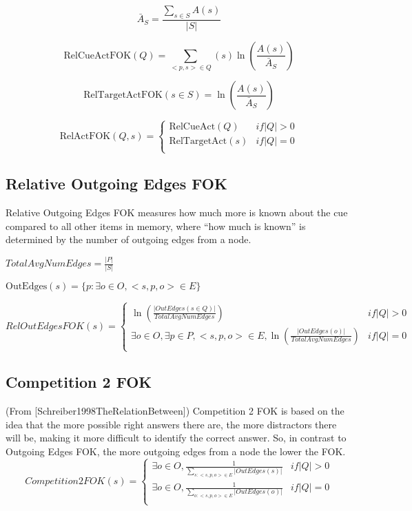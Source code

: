 \documentclass[10pt,letterpaper]{article}
\begin{document}
$$\bar{A}_S = \frac {\sum_{s{\in}S} {A(s)}}{|S|}$$

$$\text{RelCueActFOK}(Q) = \sum_{<p, s> \in Q} (s) \ln(\frac{A(s)}{\bar{A}_S})$$

$$\text{RelTargetActFOK}(s{\in}S) = \ln(\frac{A(s)}{\bar{A}_S})$$

$$\text{RelActFOK}(Q, s) =
\begin{cases}
    \text{RelCueAct}(Q) & {if |Q| > 0} \\
    \text{RelTargetAct}(s)& {if |Q| = 0} \\
\end{cases}
$$

\subsection{Relative Outgoing Edges FOK}

Relative Outgoing Edges FOK measures how much more is known about the cue compared to all other items in memory, where “how much is known” is determined by the number of outgoing edges from a node.

$TotalAvgNumEdges = \frac{|P|}{|S|}$

$\text{OutEdges}(s) = \{p : \exists o{\in}O, <s, p, o>{\in}E \}$

$$RelOutEdgesFOK(s) =
\begin{cases}
    \ln (\frac{|OutEdges(s \in Q)|}{TotalAvgNumEdges}) & {if |Q| > 0} \\
    \exists o{\in}O, \exists p{\in}P, <s, p, o>{\in}E, \ln(\frac{|OutEdges(o)|}{TotalAvgNumEdges}) & {if |Q| = 0} \\
\end{cases}
$$

\subsection{Competition 2 FOK}

(From [Schreiber1998TheRelationBetween])
Competition 2 FOK is based on the idea that the more possible right answers there are, the more distractors there will be, making it more difficult to identify the correct answer. So, in contrast to Outgoing Edges FOK, the more outgoing edges from a node the lower the FOK.
\noindent$$Competition2FOK(s) =
\begin{cases}
    \exists o{\in}O, \frac{1}{\sum\limits_{s: <s, p, o> \in E} {|OutEdges(s)|}} & {if |Q| > 0} \\
    \exists o{\in}O, \frac{1}{\sum\limits_{o: <s, p, o> \in E} {|OutEdges(o)|}} & {if |Q| = 0} \\
\end{cases}
$$
\end{document}
